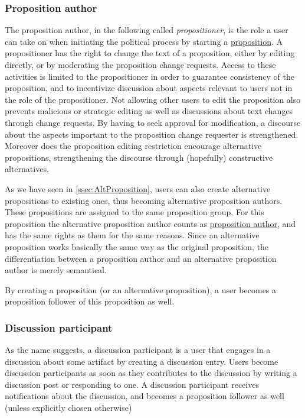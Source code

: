 \subsubsection{Proposition author}
\label{ssec:Roles_propositioner}
The proposition author, in the following called \textit{propositioner}, is the role a user can take on when initiating the political process by starting a \hyperref[sec:Model_Propositions]{proposition}.
A propositioner has the right to change the text of a proposition, either by editing directly, or by moderating the proposition change requests.
Access to these activities is limited to the propositioner in order to guarantee consistency of the proposition, and to incentivize discussion about aspects relevant to users not in the role of the propositioner.
Not allowing other users to edit the proposition also prevents malicious or strategic editing as well as discussions about text changes through change requests.
By having to seek approval for modification, a discourse about the aspects important to the proposition change requester is strengthened.
Moreover does the proposition editing restriction encourage alternative propositions, strengthening the discourse through (hopefully) constructive alternatives.

As we have seen in \ref{ssec:AltProposition}, users can also create alternative propositions to existing ones, thus becoming alternative proposition authors.
These propositions are assigned to the same proposition group.
For this proposition the alternative proposition author counts as \hyperref[ssec:Roles_propositioner]{proposition author}, and has the same rights as them for the same reasons.
Since an alternative proposition works basically the same way as the original proposition, the differentiation between a proposition author and an alternative proposition author is merely semantical. 

By creating a proposition (or an alternative proposition), a user becomes a proposition follower of this proposition as well.

\subsubsection{Discussion participant}
\label{ssec:Roles_DiscussionParticipant}
As the name suggests, a discussion participant is a user that engages in a discussion about some artifact by creating a discussion entry.
Users become discussion participants as soon as they contributes to the discussion by writing a discussion post or responding to one. A discussion participant receives notifications about the discussion, and becomes a proposition follower as well (unless explicitly chosen otherwise)

